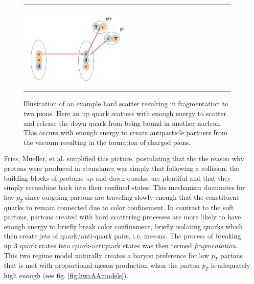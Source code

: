 \begin{figure}[htbp!]
  \centering    \rule{35em}{0.5pt}
    \includegraphics[width=0.5\textwidth]{Figures/fragmentationdiag.JPG}

  \caption[Illustration of an example hard scatter resulting in fragmentation to two pions]{Illustration of an example hard scatter resulting in fragmentation to two pions. Here an up quark scatters with enough energy to scatter and release the down quark from being bound in another nucleon. This occurs with enough energy to create antiparticle partners from the vacuum resulting in the formation of charged pions.}
  \label{fig:fragmentationdiag}    \rule{35em}{0.5pt}
\end{figure} 
Fries, M{\"u}eller, et al. simplified this picture, postulating that the the reason why protons were produced in abundance was simply that following a collision, the building blocks of protons: up and down quarks, are plentiful and that they simply recombine back into their confined states. This mechanism dominates for low $p_{T}$ since outgoing partons are traveling slowly enough that the constituent quarks to remain connected due to color confinement. In contrast to the soft partons, partons created with hard scattering processes are more likely to have enough energy to briefly break color confinement, briefly isolating quarks which then create jets of quark/anti-quark pairs, i.e. mesons. The process of breaking up 3 quark states into quark-antiquark states was then termed \textit{fragmentation}. This two regime model naturally creates a baryon preference for low $p_{T}$ partons that is met with proportional meson production when the parton $p_{T}$ is adequately high enough (see fig. \ref{fig:hwaAAmodels}).


